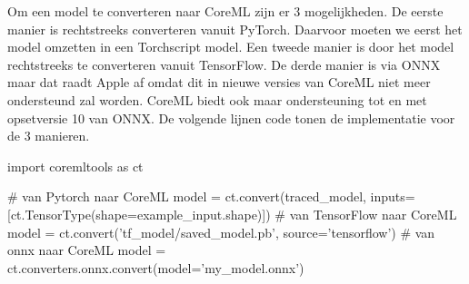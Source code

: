 Om een model te converteren naar CoreML zijn er 3 mogelijkheden.
De eerste manier is rechtstreeks converteren vanuit PyTorch.
Daarvoor moeten we eerst het model omzetten in een Torchscript model.
Een tweede manier is door het model rechtstreeks te converteren vanuit TensorFlow.
De derde manier is via ONNX maar dat raadt Apple af omdat dit in nieuwe versies van CoreML niet meer ondersteund zal worden.
CoreML biedt ook maar ondersteuning tot en met opsetversie 10 van ONNX.
De volgende lijnen code tonen de implementatie voor de 3 manieren.

\begin{python}
import coremltools as ct

# van Pytorch naar CoreML
model = ct.convert(traced_model, inputs=[ct.TensorType(shape=example_input.shape)])
# van TensorFlow naar CoreML
model = ct.convert('tf_model/saved_model.pb', source='tensorflow')
# van onnx naar CoreML
model  = ct.converters.onnx.convert(model='my_model.onnx')
\end{python}



